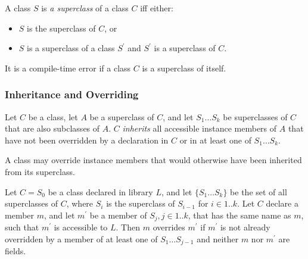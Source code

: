 \documentclass{article}
\begin{document}
\LMHash{}
A class $S$ is {\em a superclass} of a class $C$ iff either:
\begin{itemize}
\item $S$ is the superclass of $C$, or 
\item $S$ is a superclass of a class $S^{\prime}$ and $S^{\prime}$ is a superclass of $C$. 
\end{itemize}

\LMHash{}
It is a compile-time error if a class $C$ is a superclass of itself.


    
 
 \subsubsection{Inheritance and Overriding}



\LMHash{}
Let $C$ be a class,  let $A$ be a superclass of $C$, and let  $S_1 \ldots S_k$ be superclasses of $C$ that are also subclasses of $A$. $C$ {\em inherits} all accessible instance  members of  $A$ that have not been overridden by a declaration in $C$ or in at least one of $S_1 \ldots S_k$.


\LMHash{}
A class may override instance members that would otherwise have been inherited from its superclass. 

\LMHash{}
Let $C = S_0$ be a class declared in library $L$, and let $\{S_1 \ldots S_k\}$ be the set of all superclasses of $C$, where $S_i$ is the superclass of $S_{i-1}$ for $i \in 1 .. k$. Let $C$ declare a member $m$, and let  $m^\prime$ be a member of $S_j, j  \in 1 .. k$,  that has the same name as $m$, such that $m^\prime$ is accessible to $L$.  Then $m$ overrides $m^\prime$ if $m^\prime$ is not already overridden by a member of at least one of $S_1 \ldots S_{j-1}$ and neither $m$ nor $m^\prime$ are fields.

\end{document}
